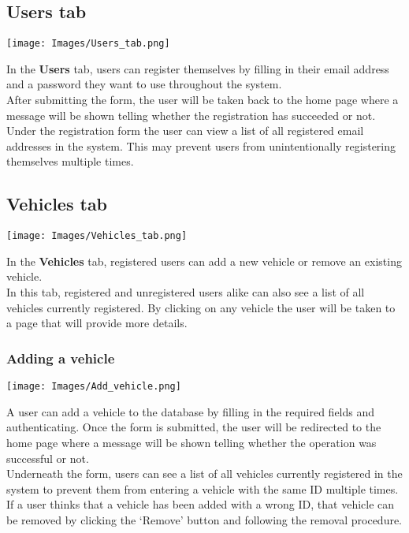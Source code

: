 \documentclass[12pt]{article}
\begin{document}
\subsection{Users tab}
\begin{center}
	\texttt{[image: Images/Users\_tab.png]}
\end{center}
In the \textbf{Users} tab, users can register themselves by filling in their email address and a password they want to use throughout the system.\\
After submitting the form, the user will be taken back to the home page where a message will be shown telling whether the registration has succeeded or not.\\
Under the registration form the user can view a list of all registered email addresses in the system. This may prevent users from unintentionally registering themselves multiple times.

\subsection{Vehicles tab}
\begin{center}
	\texttt{[image: Images/Vehicles\_tab.png]}
\end{center}
In the \textbf{Vehicles} tab, registered users can add a new vehicle or remove an existing vehicle.\\
In this tab, registered and unregistered users alike can also see a list of all vehicles currently registered. By clicking on any vehicle the user will be taken to a page that will provide more details.

\subsubsection{Adding a vehicle}
\begin{center}
	\texttt{[image: Images/Add\_vehicle.png]}
\end{center}
A user can add a vehicle to the database by filling in the required fields and authenticating. Once the form is submitted, the user will be redirected to the home page where a message will be shown telling whether the operation was successful or not.\\
Underneath the form, users can see a list of all vehicles currently registered in the system to prevent them from entering a vehicle with the same ID multiple times.\\
If a user thinks that a vehicle has been added with a wrong ID, that vehicle can be removed by clicking the `Remove' button and following the removal procedure.
\end{document}
